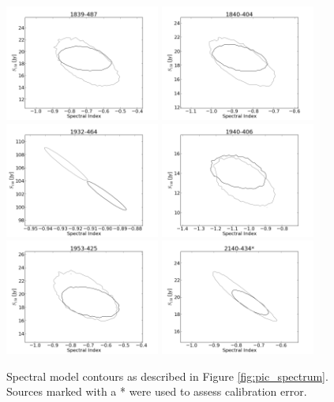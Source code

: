 \documentclass[preprint]{aastex}
\begin{document}
\begin{figure}[htbp]
\begin{center}
\includegraphics[width=2in]{plots/1839-487_SI_MCMC.png} %
\includegraphics[width=2in]{plots/1840-404_SI_MCMC.png} %
\includegraphics[width=2in]{plots/1932-464_SI_MCMC.png} %
\includegraphics[width=2in]{plots/1940-406_SI_MCMC.png} %
\includegraphics[width=2in]{plots/1953-425_SI_MCMC.png} %
\includegraphics[width=2in]{plots/2140-434_SI_MCMC.png} %
\end{center}
\caption{Spectral model contours as described in Figure \ref{fig:pic_spectrum}. Sources marked with a
* were used to assess calibration error.
}\label{fig:SI_contour_4}
\end{figure}
\end{document}
